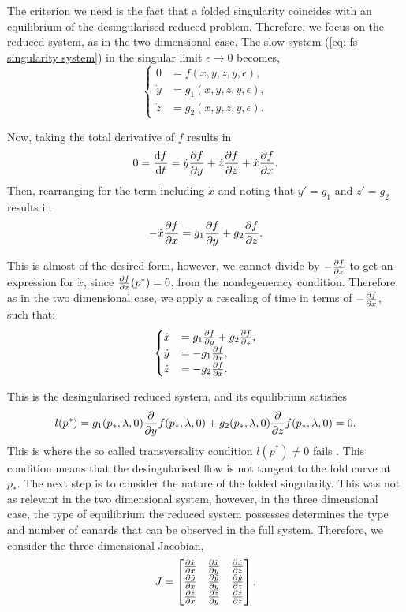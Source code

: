 The criterion we need is the fact that a folded singularity coincides with an equilibrium of the desingularised reduced problem. Therefore, we focus on the reduced system, as in the two dimensional case. The slow system (\ref{eq: fs singularity system}) in the singular limit $\epsilon \to 0$ becomes,
\begin{equation}
\begin{cases}
0 &=f(x,y,z,y,\epsilon),\\
\dot{y}&=g_1(x,y,z,y,\epsilon),\\
\dot{z}&=g_2(x,y,z,y,\epsilon).
\end{cases}\label{eq: fs singularity systemeps0}
\end{equation}

Now, taking the total derivative of $f$ results in
\begin{align*}
0 = \od{f}{t} =\dot{y}\pd{f}{y}+\dot{z}\pd{f}{z} + \dot{x}\pd{f}{x}.
\end{align*}
Then, rearranging for the term including $\dot{x}$ and noting that $ y'=g_1 $ and $ z'=g_2 $ results in
\begin{align*}
-\dot{x}\pd{f}{x} = g_1 \pd{f}{y}+ g_2\pd{f}{z}.
\end{align*}

This is almost of the desired form, however, we cannot divide by $-\pd{f}{x}$ to get an expression for $\dot{x}$, since $\pd{f}{x}(p^*)=0$, from the nondegeneracy condition.
Therefore, as in the two dimensional case, we apply a rescaling of time in terms of $-\pd{f}{x}$, such that:
\begin{equation} \label{somegenericthreedim}
\begin{cases}
\dot{x}&=g_1\pd{f}{y}+g_2\pd{f}{z},\\
\dot{y}&=-g_1\pd{f}{x},\\
\dot{z}&=-g_2\pd{f}{x}.
\end{cases}
\end{equation}

This is the desingularised reduced system, and its equilibrium satisfies
\begin{align*}
l(p^*)= g_1(p_*,\lambda,0)\pd{}{y}f(p_*,\lambda,0)+g_2(p_*,\lambda,0)\pd{}{z}f(p_*,\lambda,0)=0.
\end{align*}
This is where the so called transversality condition $l(p^*) \neq 0$ fails \citep{Kuehn}. This condition means that the desingularised flow is not tangent to the fold curve at $p_*$.
The next step is to consider the nature of the folded singularity. This was not as relevant in the two dimensional system, however, in the three dimensional case, the type of equilibrium the reduced system possesses determines the type and number of canards that can be observed in the full system.
Therefore, we consider the three dimensional Jacobian,
\begin{equation}
J=\begin{bmatrix}
\pd{\dot{x}}{x}&\pd{\dot{x}}{y}&\pd{\dot{x}}{z}\\
\pd{\dot{y}}{x}&\pd{\dot{y}}{y}&\pd{\dot{y}}{z}\\
\pd{\dot{z}}{x}&\pd{\dot{z}}{y}&\pd{\dot{z}}{z}\\
\end{bmatrix}.
\end{equation}

